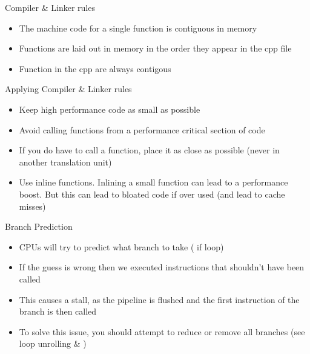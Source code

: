 \begin{frame}{Compiler \& Linker rules}
\begin{itemize}
	\pause \item The machine code for a single function is contiguous in memory
	\pause \item Functions are laid out in memory in the order they appear in the cpp file
	\pause \item Function in the cpp are always contigous
\end{itemize}
\end{frame}

\begin{frame}{Applying Compiler \& Linker rules}
\begin{itemize}
	\pause \item Keep high performance code as small as possible
	\pause \item Avoid calling functions from a performance critical section of code
	\pause \item If you do have to call a function, place it as close as possible (never in another translation unit)
	\pause \item Use inline functions. Inlining a small function can lead to a performance boost. But this can lead to bloated code if over used (and lead to cache misses)
\end{itemize}
\end{frame}

\begin{frame}{Branch Prediction}
\begin{itemize}
	\pause \item CPUs will try to predict what branch to take ( if loop)
	\pause \item If the guess is wrong then we executed instructions that shouldn't have been called
	\pause \item This causes a stall, as the pipeline is flushed and the first instruction of the branch is then called
	\pause \item To solve this issue, you should attempt to reduce or remove all branches (see loop unrolling \& )
\end{itemize}
\end{frame}




